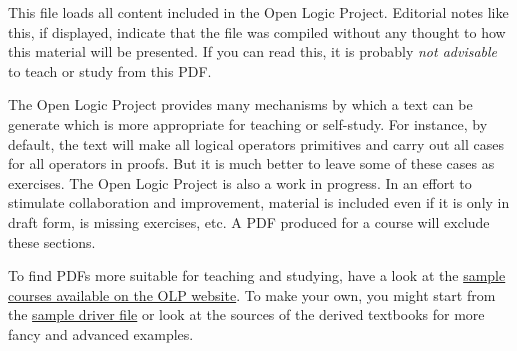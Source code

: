 \documentclass[../include/open-logic-part]{subfiles}
\begin{document}
\clearpage

\begin{editorial}
This file loads all content included in the Open Logic Project.
Editorial notes like this, if displayed, indicate that the file was
compiled without any thought to how this material will be presented.
If you can read this, it is probably \emph{not advisable} to teach or
study from this PDF. 

The Open Logic Project provides many mechanisms by which a text can be
generate which is more appropriate for teaching or self-study.  For
instance, by default, the text will make all logical operators
primitives and carry out all cases for all operators in proofs.  But
it is much better to leave some of these cases as exercises. The Open
Logic Project is also a work in progress. In an effort to stimulate
collaboration and improvement, material is included even if it is
only in draft form, is missing exercises, etc.  A PDF produced for a
course will exclude these sections.

To find PDFs more suitable for teaching and studying, have a look at
the \href{http://builds.openlogicproject.org/}{sample courses
  available on the OLP website}. To make your own, you might start
from the
\href{https://github.com/OpenLogicProject/OpenLogic/tree/master/courses/sample}{sample
  driver file} or look at the sources of the derived textbooks for
more fancy and advanced examples.
\end{editorial}

















\end{document}
